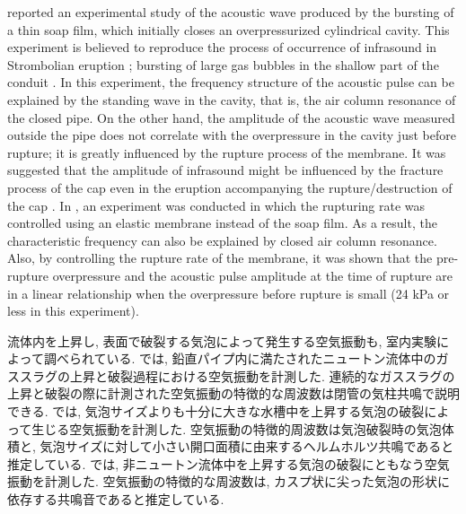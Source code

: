 \documentclass[12pt]{article}
\begin{document}
\cite{Vidal2006a} reported an experimental study of the acoustic wave produced by the bursting of a thin soap film, which initially closes an overpressurized cylindrical cavity.
This experiment is believed to reproduce the process of occurrence of infrasound in Strombolian eruption \citep {Chouet1974, BLACKBURN1976, Vergniolle1996c}; bursting of large gas bubbles in the shallow part of the conduit  \citep{Vidal2010a, Gerst2013a}.
In this experiment, the frequency structure of the acoustic pulse can be explained by the standing wave in the cavity, that is, the air column resonance of the closed pipe.
On the other hand, the amplitude of the acoustic wave measured outside the pipe does not correlate with the overpressure in the cavity just before rupture; it is greatly influenced by the rupture process of the membrane.
It was suggested that the amplitude of infrasound might be influenced by the fracture process of the cap even in the eruption accompanying the rupture/destruction of the cap \citep{Vidal2010a}.
In \cite{Sanchez2014}, an experiment was conducted in which the rupturing rate was controlled using an elastic membrane instead of the soap film.
As a result, the characteristic frequency can also be explained by closed air column resonance.
Also, by controlling the rupture rate of the membrane, it was shown that the pre-rupture overpressure and the acoustic pulse amplitude at the time of rupture are in a linear relationship when the overpressure before rupture is small (24 kPa or less in this experiment).

流体内を上昇し, 表面で破裂する気泡によって発生する空気振動も, 室内実験によって調べられている.
\cite{James2004}では, 鉛直パイプ内に満たされたニュートン流体中のガススラグの上昇と破裂過程における空気振動を計測した. 連続的なガススラグの上昇と破裂の際に計測された空気振動の特徴的な周波数は閉管の気柱共鳴で説明できる. 
\cite{Spiel1992}では, 気泡サイズよりも十分に大きな水槽中を上昇する気泡の破裂によって生じる空気振動を計測した. 空気振動の特徴的周波数は気泡破裂時の気泡体積と, 気泡サイズに対して小さい開口面積に由来するヘルムホルツ共鳴であると推定している.
\cite{Divoux2008}では, 非ニュートン流体中を上昇する気泡の破裂にともなう空気振動を計測した. 空気振動の特徴的な周波数は, カスプ状に尖った気泡の形状に依存する共鳴音であると推定している.
\end{document}
